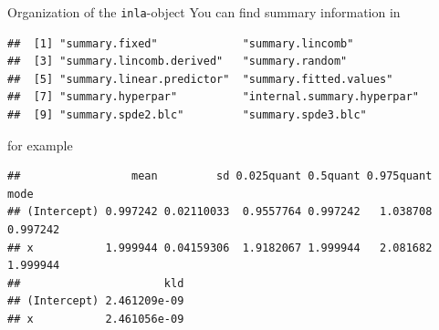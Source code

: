 \documentclass[
  ignorenonframetext,
]{beamer}
\newenvironment{Shaded}{\begin{snugshade}}{\end{snugshade}}
\newcommand{\NormalTok}[1]{#1}
\newcommand{\SpecialCharTok}[1]{\textcolor[rgb]{0.00,0.00,0.00}{#1}}
\begin{document}
\begin{frame}[fragile]{Organization of the \texttt{inla}-object}
\protect\hypertarget{organization-of-the-inla-object-1}{}
You can find summary information in \small

\begin{verbatim}
##  [1] "summary.fixed"             "summary.lincomb"          
##  [3] "summary.lincomb.derived"   "summary.random"           
##  [5] "summary.linear.predictor"  "summary.fitted.values"    
##  [7] "summary.hyperpar"          "internal.summary.hyperpar"
##  [9] "summary.spde2.blc"         "summary.spde3.blc"
\end{verbatim}

\normalsize

for example

\scriptsize

\begin{Shaded}
\end{Shaded}

\begin{verbatim}
##                 mean         sd 0.025quant 0.5quant 0.975quant     mode
## (Intercept) 0.997242 0.02110033  0.9557764 0.997242   1.038708 0.997242
## x           1.999944 0.04159306  1.9182067 1.999944   2.081682 1.999944
##                      kld
## (Intercept) 2.461209e-09
## x           2.461056e-09
\end{verbatim}

\normalsize
\end{frame}
\end{document}
